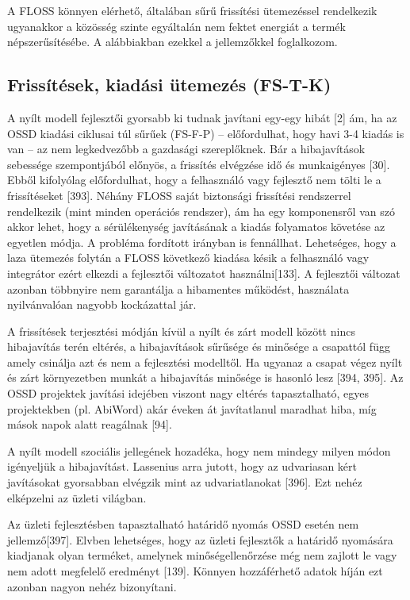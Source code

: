 \documentclass[12pt,magyar,a4paper,oneside]{scrreprt}
\begin{document}
A FLOSS könnyen elérhető, általában sűrű frissítési ütemezéssel
rendelkezik ugyanakkor a közösség szinte egyáltalán nem fektet energiát
a termék népszerűsítésébe. A alábbiakban ezekkel a jellemzőkkel
foglalkozom.

\hypertarget{sec:FS-T-K}{%
\subsection{Frissítések, kiadási ütemezés (FS-T-K)}\label{sec:FS-T-K}}

A nyílt modell fejlesztői gyorsabb ki tudnak javítani egy-egy hibát
{[}2{]} ám, ha az OSSD kiadási ciklusai túl sűrűek (FS-F-P) --
előfordulhat, hogy havi 3-4 kiadás is van -- az nem legkedvezőbb a
gazdasági szereplőknek. Bár a hibajavítások sebessége szempontjából
előnyös, a frissítés elvégzése idő és munkaigényes {[}30{]}. Ebből
kifolyólag előfordulhat, hogy a felhasználó vagy fejlesztő nem tölti le
a frissítéseket {[}393{]}. Néhány FLOSS saját biztonsági frissítési
rendszerrel rendelkezik (mint minden operációs rendszer), ám ha egy
komponensről van szó akkor lehet, hogy a sérülékenység javításának a
kiadás folyamatos követése az egyetlen módja. A probléma fordított
irányban is fennállhat. Lehetséges, hogy a laza ütemezés folytán a FLOSS
következő kiadása késik a felhasználó vagy integrátor ezért elkezdi a
fejlesztői változatot használni{[}133{]}. A fejlesztői változat azonban
többnyire nem garantálja a hibamentes működést, használata nyilvánvalóan
nagyobb kockázattal jár.

A frissítések terjesztési módján kívül a nyílt és zárt modell között
nincs hibajavítás terén eltérés, a hibajavítások sűrűsége és minősége a
csapattól függ amely csinálja azt és nem a fejlesztési modelltől. Ha
ugyanaz a csapat végez nyílt és zárt környezetben munkát a hibajavítás
minősége is hasonló lesz {[}394, 395{]}. Az OSSD projektek javítási
idejében viszont nagy eltérés tapasztalható, egyes projektekben (pl.
AbiWord) akár éveken át javítatlanul maradhat hiba, míg mások napok
alatt reagálnak {[}94{]}.

A nyílt modell szociális jellegének hozadéka, hogy nem mindegy milyen
módon igényeljük a hibajavítást. Lassenius arra jutott, hogy az
udvariasan kért javításokat gyorsabban elvégzik mint az udvariatlanokat
{[}396{]}. Ezt nehéz elképzelni az üzleti világban.

Az üzleti fejlesztésben tapasztalható határidő nyomás OSSD esetén nem
jellemző{[}397{]}. Elvben lehetséges, hogy az üzleti fejlesztők a
határidő nyomására kiadjanak olyan terméket, amelynek minőségellenőrzése
még nem zajlott le vagy nem adott megfelelő eredményt {[}139{]}. Könnyen
hozzáférhető adatok híján ezt azonban nagyon nehéz bizonyítani.
\end{document}
